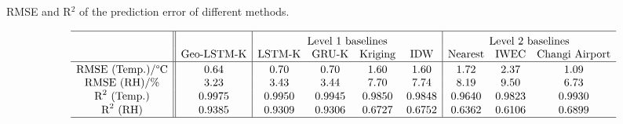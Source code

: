 \documentclass[a4paper,fleqn]{cas-sc}
\begin{document}
\begin{table}[width=.9\linewidth,pos=h] 
\caption{RMSE and R$^2$ of the prediction error of different methods.} \label{tab:RMSE}
\centering \small
\begin{displaymath}
\begin{array}{ c || c | c  c  c  c | c  c  c }
\hline
 \rule{0pt}{12pt}
 & & \multicolumn{4}{ c |}{\text{Level 1 baselines}} & \multicolumn{3}{ c }{\text{Level 2 baselines}}\\
  &   \text{Geo-LSTM-K} &   \text{LSTM-K}   & \text{GRU-K}  & \text{Kriging} & \text{IDW}   & \text{Nearest}  & \text{IWEC} & \text{Changi Airport}  \\
\hline \rule{0pt}{10pt}
\text{RMSE (Temp.)/°C} & 0.64 & 0.70 &  0.70 & 1.60 & 1.60 & 1.72 & 2.37 & 1.09  \\
\text{RMSE (RH)/\%} & 3.23 & 3.43 & 3.44 & 7.70 & 7.74 & 8.19 & 9.50 & 6.73  \\
\text{R}^2\  \text{(Temp.)} & 0.9975 & 0.9950 & 0.9945 & 0.9850 & 0.9848 & 0.9640 & 0.9823 & 0.9930  \\
\text{R}^2\  \text{(RH)} & 0.9385 & 0.9309 & 0.9306 & 0.6727 & 0.6752 & 0.6362 & 0.6106 & 0.6899  \\
\hline
\end{array}
\end{displaymath}
\end{table}

\end{document}
